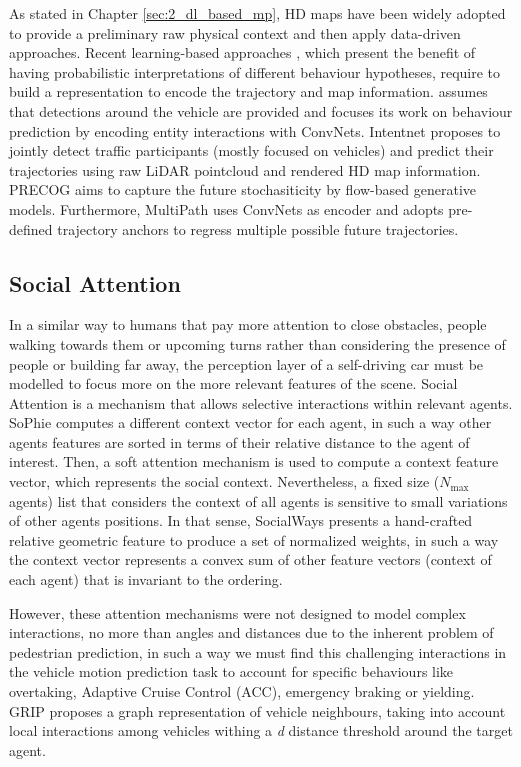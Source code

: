 As stated in Chapter \ref{sec:2_dl_based_mp}, HD maps have been widely adopted to provide a preliminary raw physical context and then apply data-driven approaches. Recent learning-based approaches \cite{hong2019rules, casas2018intentnet}, which present the benefit of having probabilistic interpretations of different behaviour hypotheses, require to build a representation to encode the trajectory and map information. \cite{hong2019rules} assumes that detections around the vehicle are provided and focuses its work on behaviour prediction by encoding entity interactions with ConvNets. Intentnet \cite{casas2018intentnet} proposes to jointly detect traffic participants (mostly focused on vehicles) and predict their trajectories using raw LiDAR pointcloud and rendered HD map information. PRECOG \cite{rhinehart2019precog} aims to capture the future stochasiticity by flow-based generative models. Furthermore, MultiPath \cite{chai2019multipath} uses ConvNets as encoder and adopts pre-defined trajectory anchors to regress multiple possible future trajectories. 

\subsection{Social Attention}
\label{subsec:4_gan_lstm_social_attention}

In a similar way to humans that pay more attention to close obstacles, people walking towards them or upcoming turns rather than considering the presence of people or building far away, the perception layer of a self-driving car must be modelled to focus more on the more relevant features of the scene. Social Attention is a mechanism that allows selective interactions within relevant agents. SoPhie \cite{sadeghian2019sophie} computes a different context vector for each agent, in such a way other agents features are sorted in terms of their relative distance to the agent of interest. Then, a soft attention mechanism is used to compute a context feature vector, which represents the social context. Nevertheless, a fixed size ($N_{\text{max}}$ agents) list that considers the context of all agents is sensitive to small variations \cite{mercat2020multi} of other agents positions. In that sense, SocialWays \cite{amirian2019social} presents a hand-crafted relative geometric feature to produce a set of normalized weights, in such a way the context vector represents a convex sum of other feature vectors (context of each agent) that is invariant to the ordering. 

However, these attention mechanisms were not designed to model complex interactions, no more than angles and distances due to the inherent problem of pedestrian prediction, in such a way we must find this challenging interactions in the vehicle motion prediction task to account for specific behaviours like overtaking, Adaptive Cruise Control (ACC), emergency braking or yielding. GRIP \cite{li2019grip} proposes a graph representation of vehicle neighbours, taking into account local interactions among vehicles withing a \textit{d} distance threshold around the target agent. 

